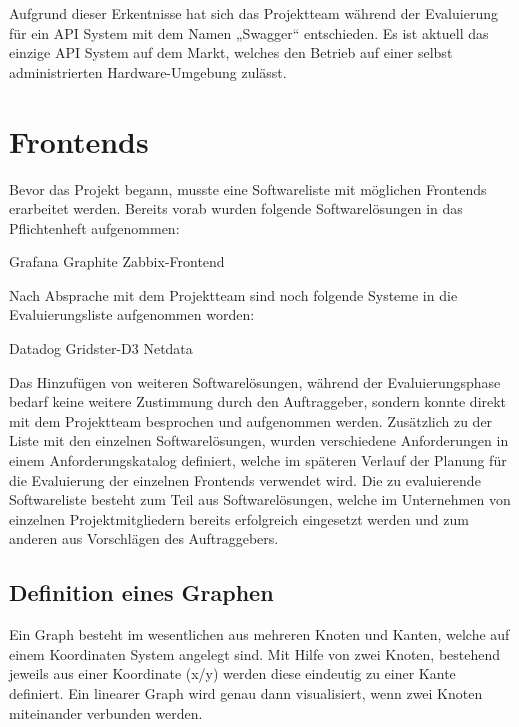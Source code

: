 Aufgrund dieser Erkentnisse hat sich das Projektteam während der Evaluierung
für ein API System mit dem Namen „Swagger“ entschieden. Es ist aktuell das
einzige API System auf dem Markt, welches den Betrieb auf einer selbst
administrierten Hardware-Umgebung zulässt.
\nl%

\section{Frontends}
\label{sec:frontends}
Bevor das Projekt begann, musste eine Softwareliste mit möglichen Frontends
erarbeitet werden. Bereits vorab wurden folgende Softwarelösungen in das
Pflichtenheft aufgenommen:

\begin{outline}
  \1 Grafana
  \1 Graphite
  \1 Zabbix-Frontend
\end{outline}

Nach Absprache mit dem Projektteam sind noch folgende Systeme in die
Evaluierungsliste aufgenommen worden:

\begin{outline}
  \1 Datadog
  \1 Gridster-D3
  \1 Netdata
\end{outline}

Das Hinzufügen von weiteren Softwarelösungen, während der Evaluierungsphase
bedarf keine weitere Zustimmung durch den Auftraggeber, sondern konnte direkt
mit dem Projektteam besprochen und aufgenommen werden. Zusätzlich zu der Liste
mit den einzelnen Softwarelösungen, wurden verschiedene Anforderungen in einem
Anforderungskatalog definiert, welche im späteren Verlauf der Planung für die
Evaluierung der einzelnen Frontends verwendet wird. Die zu evaluierende
Softwareliste besteht zum Teil aus Softwarelösungen, welche im Unternehmen von
einzelnen Projektmitgliedern bereits erfolgreich eingesetzt werden und zum
anderen aus Vorschlägen des Auftraggebers.
\mr%

\subsection{Definition eines Graphen}
\label{definition_eines_graphen}
Ein Graph besteht im wesentlichen aus mehreren Knoten und Kanten, welche auf
einem Koordinaten System angelegt sind. Mit Hilfe von zwei Knoten, bestehend
jeweils aus einer Koordinate (x/y) werden diese eindeutig zu einer Kante
definiert. Ein linearer Graph wird genau dann visualisiert, wenn zwei Knoten
miteinander verbunden werden.

